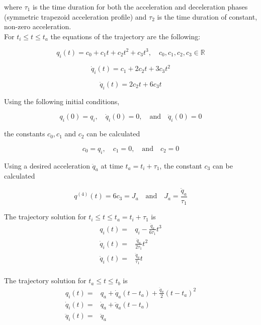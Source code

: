 where $τ_1$ is the time duration for both the acceleration and deceleration phases (symmetric trapezoid acceleration profile) and $τ_2$ is the time duration of constant, non-zero acceleration. \\

For $t_i \leq t \leq t_a$ the equations of the trajectory are the following:

\begin{equation}
q_i(t) = c_0 + c_1t + c_2t^2 + c_3t^3, \quad c_0,c_1,c_2,c_3 \in \mathbb{R}
\end{equation}

\begin{equation}
\dot{q}_i(t) = c_1 + 2c_2t + 3c_3t^2
\end{equation}

\begin{equation}
\ddot{q}_i(t) = 2c_2t + 6c_3t
\end{equation}

Using the following initial conditions, 

\begin{equation}
q_i(0) = q_i, \quad \dot{q}_i(0) = 0, \quad \textrm{and} \quad \ddot{q}_i(0) = 0
\end{equation}

the constants $c_0,c_1$ and $c_2$ can be calculated

\begin{equation}
c_0 = q_i, \quad c_1 = 0, \quad \textrm{and} \quad c_2 = 0
\end{equation}

Using a desired acceleration $\ddot{q}_a$ at time $t_a = t_i + τ_1$, the constant $c_3$ can be calculated

\begin{equation}
q^{(4)}(t) = 6c_3 = J_a \quad \textrm{and} \quad J_a = \frac{\ddot{q}_a}{τ_1}
\end{equation}

The trajectory solution for $t_i \leq t \leq t_a = t_i + τ_1$ is
\begin{equation}
\begin{aligned}
q_i(t) ={}& q_i - \frac{\ddot{q}_{a}}{6τ_1}t^3 \\
\dot{q}_i(t) ={}& \frac{\ddot{q}_{a}}{2τ_1}t^2 \\
\ddot{q}_i(t) ={}& \frac{\ddot{q}_{a}}{τ_1}t \\
\end{aligned}
\end{equation}

The trajectory solution for $t_a \leq t \leq t_b$ is
\begin{equation}
\begin{aligned}
q_i(t) ={}& q_a + \dot{q}_a(t-t_a) + \frac{\ddot{q}_a}{2}(t-t_a)^2 \\
\dot{q}_i(t) ={}& \dot{q}_a + \ddot{q}_a(t-t_a) \\
\ddot{q}_i(t) ={}& \ddot{q}_a \\
\end{aligned}
\end{equation}

